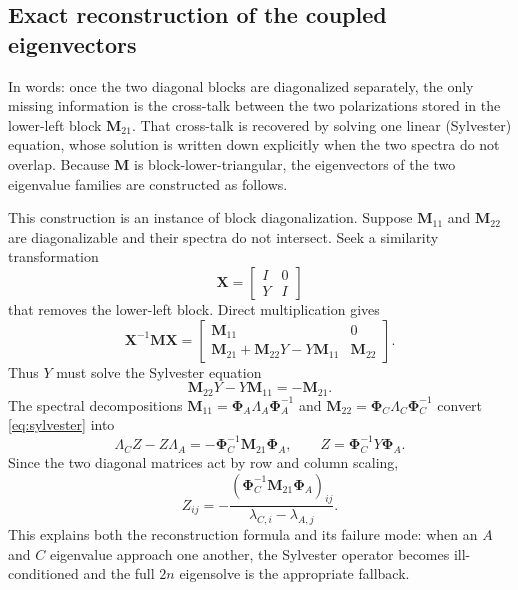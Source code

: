 \documentclass[11pt]{article}
\theoremstyle{remark}
\newcommand{\Ph}{\mathbf{\Phi}}
\begin{document}
\subsection{Exact reconstruction of the coupled eigenvectors}
\label{sec:vecrec}

In words: once the two diagonal blocks are diagonalized separately, the only
missing information is the cross-talk between the two polarizations stored in
the lower-left block $\mathbf{M}_{21}$.  That cross-talk is recovered by
solving one linear (Sylvester) equation, whose solution is written down
explicitly when the two spectra do not overlap.  Because $\mathbf{M}$ is
block-lower-triangular, the eigenvectors of the two eigenvalue families are
constructed as follows.

This construction is an instance of block diagonalization.  Suppose
$\mathbf{M}_{11}$ and $\mathbf{M}_{22}$ are diagonalizable and their spectra do
not intersect.  Seek a similarity transformation
\begin{equation}
\mathbf{X}=\begin{bmatrix}I&0\\Y&I\end{bmatrix}
\end{equation}
that removes the lower-left block.  Direct multiplication gives
\begin{equation}
\mathbf{X}^{-1}\mathbf{M}\mathbf{X}
=\begin{bmatrix}
\mathbf{M}_{11}&0\\
\mathbf{M}_{21}+\mathbf{M}_{22}Y-Y\mathbf{M}_{11}&\mathbf{M}_{22}
\end{bmatrix}.
\end{equation}
Thus $Y$ must solve the Sylvester equation
\begin{equation}
\mathbf{M}_{22}Y-Y\mathbf{M}_{11}=-\mathbf{M}_{21}.
\label{eq:sylvester}
\end{equation}
The spectral decompositions
$\mathbf{M}_{11}=\Ph_A\Lambda_A\Ph_A^{-1}$ and
$\mathbf{M}_{22}=\Ph_C\Lambda_C\Ph_C^{-1}$ convert
\eqref{eq:sylvester} into
\begin{equation}
\Lambda_C Z-Z\Lambda_A=-\Ph_C^{-1}\mathbf{M}_{21}\Ph_A,
\qquad Z=\Ph_C^{-1}Y\Ph_A.
\label{eq:sylvester-diagonal}
\end{equation}
Since the two diagonal matrices act by row and column scaling,
\begin{equation}
Z_{ij}=-\frac{(\Ph_C^{-1}\mathbf{M}_{21}\Ph_A)_{ij}}
{\lambda_{C,i}-\lambda_{A,j}}.
\label{eq:sylvester-entrywise}
\end{equation}
This explains both the reconstruction formula and its failure mode: when an
$A$ and $C$ eigenvalue approach one another, the Sylvester operator becomes
ill-conditioned and the full $2n$ eigensolve is the appropriate fallback.
\end{document}
